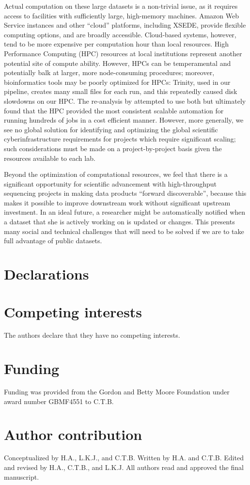 \documentclass[a4paper,num-refs]{oup-contemporary}
\begin{document}
Actual computation on these large datasets is a non-trivial issue, as
it requires access to facilities with sufficiently large, high-memory
machines.  Amazon Web Service instances and other ``cloud'' platforms,
including XSEDE, provide flexible computing options, and are broadly
accessible. Cloud-based systems, however, tend to be more expensive
per computation hour than local resources. High Performance Computing
(HPC) resources at local institutions represent another potential site
of compute ability.  However, HPCs can be temperamental and
potentially balk at larger, more node-consuming procedures; moreover,
bioinformatics tools may be poorly optimized for HPCs: Trinity, used in
our pipeline, creates many small files for each run, and this
repeatedly caused disk slowdowns on our HPC.  The re-analysis by
\citet{Johnson2018} attempted to use both but ultimately
found that the HPC provided the most consistent scalable automation
for running hundreds of jobs in a cost efficient manner.  However,
more generally, we see no global solution for identifying and
optimizing the global scientific cyberinfrastructure requirements for
projects which require significant scaling; such considerations must
be made on a project-by-project basis given the resources available to
each lab.

Beyond the optimization of computational resources, we feel that there
is a significant opportunity for scientific advancement with
high-throughput sequencing projects in making data products ``forward
discoverable'', because this makes it possible to improve downstream
work without significant upstream investment.  In an ideal future, a
researcher might be automatically notified when a dataset that she is
actively working on is updated or changes. This presents many social
and technical challenges that will need to be solved if we are to take
full advantage of public datasets.

\section{Declarations}
\section{Competing interests}
The authors declare that they have no competing interests.
\section{Funding}
Funding was provided from the Gordon and Betty Moore Foundation under award number GBMF4551 to C.T.B.
\section{Author contribution}
Conceptualized by H.A., L.K.J., and C.T.B. Written by H.A. and C.T.B. Edited and revised by H.A., C.T.B., and L.K.J. All authors read and approved the final manuscript.



\end{document}
